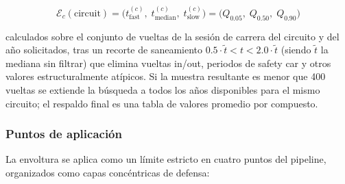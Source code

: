 \begin{equation}
    \mathcal{E}_c(\text{circuit}) =
    \bigl(t^{(c)}_\text{fast},\; t^{(c)}_\text{median},\; t^{(c)}_\text{slow}\bigr)
    = \bigl(Q_{0.05},\; Q_{0.50},\; Q_{0.90}\bigr)
    \label{eq:envelope_lap}
\end{equation}

calculados sobre el conjunto de vueltas de la sesión de carrera del circuito y del año solicitados, tras un recorte de saneamiento $0.5 \cdot \tilde{t} < t < 2.0 \cdot \tilde{t}$ (siendo $\tilde{t}$ la mediana sin filtrar) que elimina vueltas in/out, periodos de safety car y otros valores estructuralmente atípicos. Si la muestra resultante es menor que 400 vueltas se extiende la búsqueda a todos los años disponibles para el mismo circuito; el respaldo final es una tabla de valores promedio por compuesto.

\subsubsection{Puntos de aplicación}
\label{sssec:envoltura_aplicacion}

La envoltura se aplica como un límite estricto en cuatro puntos del pipeline, organizados como capas concéntricas de defensa:

